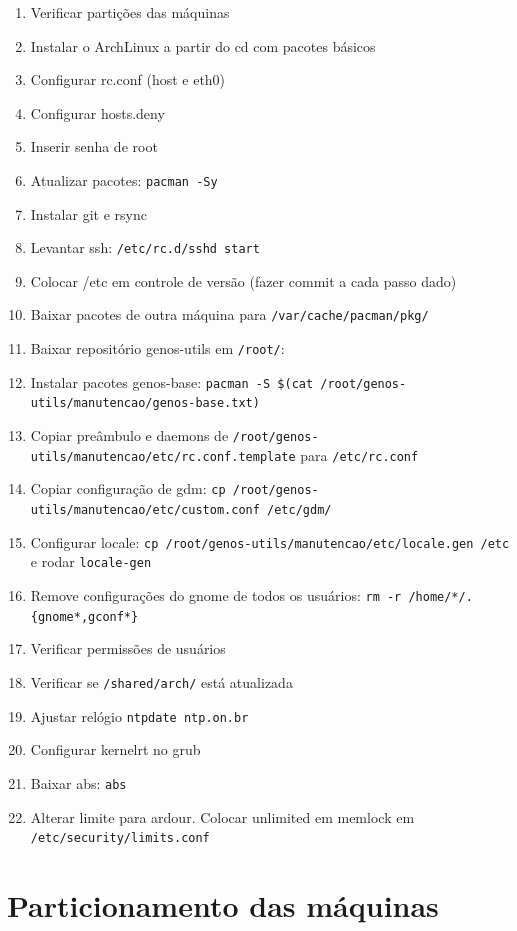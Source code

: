 \documentclass[12pt,brazil]{book}
\begin{document}
\begin{enumerate}
\item Verificar partições das máquinas
\item Instalar o ArchLinux a partir do cd com pacotes básicos
\item Configurar rc.conf (host e eth0)
\item Configurar hosts.deny
\item Inserir senha de root
\item Atualizar pacotes: \verb!pacman -Sy!
\item Instalar git e rsync
\item Levantar ssh: \verb!/etc/rc.d/sshd start!
\item Colocar /etc em controle de versão (fazer commit a cada passo dado)
\item Baixar pacotes de outra máquina para \verb!/var/cache/pacman/pkg/!
\item Baixar repositório genos-utils em \verb!/root/!:
\item Instalar pacotes genos-base: \verb!pacman -S $(cat /root/genos-utils/manutencao/genos-base.txt)!
\item Copiar preâmbulo e daemons de
  \verb!/root/genos-utils/manutencao/etc/rc.conf.template! para \verb!/etc/rc.conf!
\item Copiar configuração de gdm:
  \verb!cp /root/genos-utils/manutencao/etc/custom.conf /etc/gdm/!
\item Configurar locale:
  \verb!cp /root/genos-utils/manutencao/etc/locale.gen /etc! e rodar
  \verb!locale-gen!
\item Remove configurações do gnome de todos os usuários: \verb!rm -r /home/*/.{gnome*,gconf*}!
\item Verificar permissões de usuários
\item Verificar se \verb!/shared/arch/! está atualizada
\item Ajustar relógio \verb!ntpdate ntp.on.br!
\item Configurar kernelrt no grub
\item Baixar abs: \verb!abs!
\item Alterar limite para ardour. Colocar unlimited em memlock em
  \verb!/etc/security/limits.conf!
\end{enumerate}

\section{Particionamento das máquinas}
\label{sec:part-das-maqu}
\end{document}
